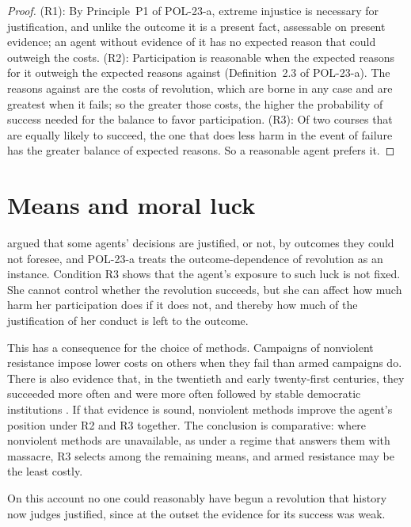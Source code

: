 \documentclass{situationist-preprint}
\begin{document}
\begin{proof}
(R1): By Principle~P1 of POL-23-a, extreme injustice is necessary for justification, and unlike the outcome it is a present fact, assessable on present evidence; an agent without evidence of it has no expected reason that could outweigh the costs. (R2): Participation is reasonable when the expected reasons for it outweigh the expected reasons against (Definition~2.3 of POL-23-a). The reasons against are the costs of revolution, which are borne in any case and are greatest when it fails; so the greater those costs, the higher the probability of success needed for the balance to favor participation. (R3): Of two courses that are equally likely to succeed, the one that does less harm in the event of failure has the greater balance of expected reasons. So a reasonable agent prefers it.
\end{proof}

\section{Means and moral luck}

\citet{Williams1981} argued that some agents' decisions are justified, or not, by outcomes they could not foresee, and POL-23-a treats the outcome-dependence of revolution as an instance. Condition R3 shows that the agent's exposure to such luck is not fixed. She cannot control whether the revolution succeeds, but she can affect how much harm her participation does if it does not, and thereby how much of the justification of her conduct is left to the outcome.

This has a consequence for the choice of methods. Campaigns of nonviolent resistance impose lower costs on others when they fail than armed campaigns do. There is also evidence that, in the twentieth and early twenty-first centuries, they succeeded more often and were more often followed by stable democratic institutions \citep{ChenowethStephan2011}. If that evidence is sound, nonviolent methods improve the agent's position under R2 and R3 together. The conclusion is comparative: where nonviolent methods are unavailable, as under a regime that answers them with massacre, R3 selects among the remaining means, and armed resistance may be the least costly.

\begin{objection}
On this account no one could reasonably have begun a revolution that history now judges justified, since at the outset the evidence for its success was weak.
\end{objection}
\end{document}
